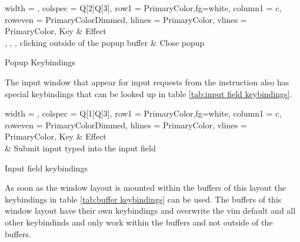 \documentclass{report}
\begin{document}
\begin{table}[H]
	\centering
	\begin{tblr}{
		width = \linewidth,
		colspec = {Q[2]Q[3]},
		row{1} = {PrimaryColor,fg=white},
		column{1} = {c},
		row{even} = {PrimaryColorDimmed},
		hlines = {PrimaryColor},
		vlines = {PrimaryColor},
		}
		Key                                                                                     & Effect      \\
		, , , clicking outside of the popup buffer & Close popup
	\end{tblr}
	\caption{Popup Keybindings}
	\label{tab:popup keybindings}
\end{table}

The input window that appear for input requests from the instruction  also has special keybindings that can be looked up in table \ref{tab:input field keybindings}.

\begin{table}[H]
	\centering
	\begin{tblr}{
		width = \linewidth,
		colspec = {Q[1]Q[3]},
		row{1} = {PrimaryColor,fg=white},
		column{1} = {c},
		row{even} = {PrimaryColorDimmed},
		hlines = {PrimaryColor},
		vlines = {PrimaryColor},
		}
		Key               & Effect                                  \\
		 & Submit input typed into the input field
	\end{tblr}
	\caption{Input field keybindings}
	\label{tab:input field keybindings}
\end{table}

As soon as the window layout is mounted within the buffers of this layout the keybindings in table \ref{tab:buffer keybindings} can be used. The buffers of this window layout have their own keybindings and overwrite the vim default and all other keybindinds and only work within the buffers and not outside of the buffers.
\end{document}
